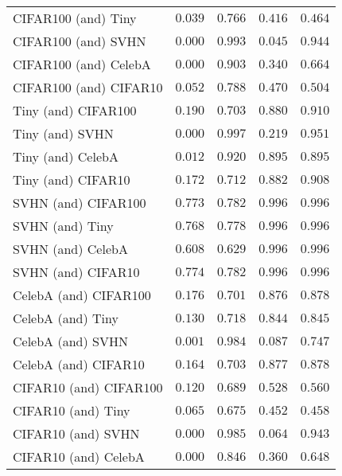 \begin{tabularx}{\textwidth}{l*{4}{Y}}
{\scriptsize CIFAR100 (and) Tiny} & $\mathbf{0.039}$ & $\mathbf{0.766}$ &$\mathbf{0.416}$ & $\mathbf{0.464}$ \\ 
{\scriptsize CIFAR100 (and) SVHN} & $\mathbf{0.000}$ & $\mathbf{0.993}$ &$\mathbf{0.045}$ & $\mathbf{0.944}$ \\ 
{\scriptsize CIFAR100 (and) CelebA} & $\mathbf{0.000}$ & $\mathbf{0.903}$ &$\mathbf{0.340}$ & $\mathbf{0.664}$ \\ 
{\scriptsize CIFAR100 (and) CIFAR10} & $\mathbf{0.052}$ & $\mathbf{0.788}$ &$0.470$ & $0.504$ \\ 
{\scriptsize Tiny (and) CIFAR100} & $\mathbf{0.190}$ & $\mathbf{0.703}$ &$0.880$ & $0.910$ \\ 
{\scriptsize Tiny (and) SVHN} & $\mathbf{0.000}$ & $\mathbf{0.997}$ &$\mathbf{0.219}$ & $\mathbf{0.951}$ \\ 
{\scriptsize Tiny (and) CelebA} & $\mathbf{0.012}$ & $\mathbf{0.920}$ &$0.895$ & $0.895$ \\ 
{\scriptsize Tiny (and) CIFAR10} & $\mathbf{0.172}$ & $\mathbf{0.712}$ &$0.882$ & $0.908$ \\ 
{\scriptsize SVHN (and) CIFAR100} & $0.773$ & $0.782$ &$0.996$ & $0.996$ \\ 
{\scriptsize SVHN (and) Tiny} & $0.768$ & $0.778$ &$0.996$ & $0.996$ \\ 
{\scriptsize SVHN (and) CelebA} & $0.608$ & $0.629$ &$0.996$ & $0.996$ \\ 
{\scriptsize SVHN (and) CIFAR10} & $0.774$ & $0.782$ &$0.996$ & $0.996$ \\ 
{\scriptsize CelebA (and) CIFAR100} & $\mathbf{0.176}$ & $\mathbf{0.701}$ &$0.876$ & $0.878$ \\ 
{\scriptsize CelebA (and) Tiny} & $\mathbf{0.130}$ & $\mathbf{0.718}$ &$0.844$ & $0.845$ \\ 
{\scriptsize CelebA (and) SVHN} & $\mathbf{0.001}$ & $\mathbf{0.984}$ &$\mathbf{0.087}$ & $\mathbf{0.747}$ \\ 
{\scriptsize CelebA (and) CIFAR10} & $\mathbf{0.164}$ & $\mathbf{0.703}$ &$0.877$ & $0.878$ \\ 
{\scriptsize CIFAR10 (and) CIFAR100} & $\mathbf{0.120}$ & $\mathbf{0.689}$ &$0.528$ & $0.560$ \\ 
{\scriptsize CIFAR10 (and) Tiny} & $\mathbf{0.065}$ & $\mathbf{0.675}$ &$0.452$ & $0.458$ \\ 
{\scriptsize CIFAR10 (and) SVHN} & $\mathbf{0.000}$ & $\mathbf{0.985}$ &$\mathbf{0.064}$ & $\mathbf{0.943}$ \\ 
{\scriptsize CIFAR10 (and) CelebA} & $\mathbf{0.000}$ & $\mathbf{0.846}$ &$\mathbf{0.360}$ & $\mathbf{0.648}$ \\ 

    \bottomrule
    \end{tabularx}
    